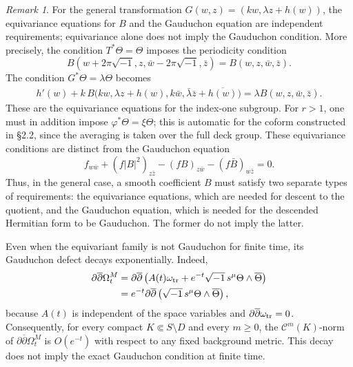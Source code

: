 \documentclass[12pt]{amsart}
\numberwithin{equation}{section}
\theoremstyle{remark}
\newtheorem{remark}{Remark}
\theoremstyle{definition}
\begin{document}
\begin{remark}
For the general transformation $G(w,z)=(kw,\lambda z+h(w))$, the equivariance equations for $B$ and the Gauduchon equation are independent requirements; equivariance alone does not imply the Gauduchon condition.
More precisely, the condition $T^*\Theta=\Theta$ imposes the periodicity condition
\begin{equation*}
B(w+2\pi\sqrt{-1},z,\bar w-2\pi\sqrt{-1},\bar z)
=
B(w,z,\bar w,\bar z).
\end{equation*}
The condition $G^*\Theta=\lambda\Theta$ becomes
\begin{align*}
h'(w)
+
k\,B
\bigl(
kw,
\lambda z+h(w),
k\bar w,
\bar\lambda\bar z+\overline{h(w)}
\bigr)
=
\lambda B(w,z,\bar w,\bar z).
\end{align*}
These are the equivariance equations for the index-one subgroup. For $r>1$, one must in addition impose $\varphi^*\Theta=\xi\Theta$; this is automatic for the coform constructed in \S2.2, since the averaging is taken over the full deck group. These equivariance conditions are distinct from the Gauduchon
equation
\begin{equation*}
f_{w\bar w}
+
(f|B|^2)_{z\bar z}
-
(fB)_{z\bar w}
-
(f\bar B)_{w\bar z}
=
0.
\end{equation*}
Thus, in the general case, a smooth coefficient $B$ must satisfy two
separate types of requirements: the equivariance equations, which are needed
for descent to the quotient, and the Gauduchon equation, which is needed for
the descended Hermitian form to be Gauduchon. The former do not imply the latter.
\end{remark}


Even when the equivariant family is not Gauduchon for finite time, its
Gauduchon defect decays exponentially. Indeed,
\begin{align*}
\partial\overline{\partial}\Omega_t^M
&=
\partial\overline{\partial}
\left(
A(t)\omega_{\rm tr}
+
e^{-t}\sqrt{-1}\,s^\mu\Theta\wedge\overline{\Theta}
\right)\\
&=
e^{-t}
\partial\overline{\partial}
\left(
\sqrt{-1}\,s^\mu\Theta\wedge\overline{\Theta}
\right),
\end{align*}
because $A(t)$ is independent of the space variables and $\partial\overline{\partial}\omega_{\rm tr}=0$.
Consequently, for every compact $K\Subset S\setminus D$ and every $m\geq0$, the $\mathcal C^m(K)$-norm of $\partial\overline\partial\Omega_t^M$ is $O(e^{-t})$ with respect to any fixed background metric. This decay does not imply the exact Gauduchon condition at finite time.
\end{document}

